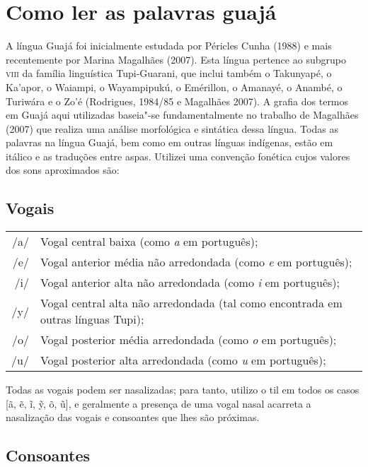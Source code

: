 
\chapter{Como ler as palavras guajá}


A língua Guajá foi inicialmente estudada por Péricles Cunha (1988) e
mais recentemente por Marina Magalhães (2007). Esta língua pertence ao
subgrupo \textsc{viii} da família linguística Tupi-Guarani, que inclui também o
Takunyapé, o Ka'apor, o Waiampi, o Wayampipukú, o Emérillon, o Amanayé,
o Anambé, o Turiwára e o Zo'é (Rodrigues, 1984/85 e Magalhães 2007). A
grafia dos termos em Guajá aqui utilizadas baseia"-se fundamentalmente no
trabalho de Magalhães (2007) que realiza uma análise morfológica e
sintática dessa língua. Todas as palavras na língua Guajá, bem como em
outras línguas indígenas, estão em itálico e as traduções entre aspas.
Utilizei uma convenção fonética cujos valores dos sons aproximados são:

\section{Vogais}

\begin{tabular}{rl}
/a/ & Vogal central baixa (como \emph{a} em português);\\
/e/ & Vogal anterior média não arredondada (como \emph{e} em português);\\
/i/ & Vogal anterior alta não arredondada (como \emph{i} em português);\\
/y/ & \parbox{.85\textwidth}{Vogal central alta não arredondada (tal como encontrada em outras línguas Tupi);}\\
/o/ & Vogal posterior média arredondada (como \emph{o} em português);\\
/u/ & Vogal posterior alta arredondada (como \emph{u} em português);
\end{tabular} 

\medskip

Todas as vogais podem ser nasalizadas; para tanto, utilizo o til em
todos os casos {[}ã, ẽ, ĩ, ỹ, õ, ũ{]}, e geralmente a presença de uma
vogal nasal acarreta a nasalização das vogais e consoantes que lhes são
próximas.

\section{Consoantes}

